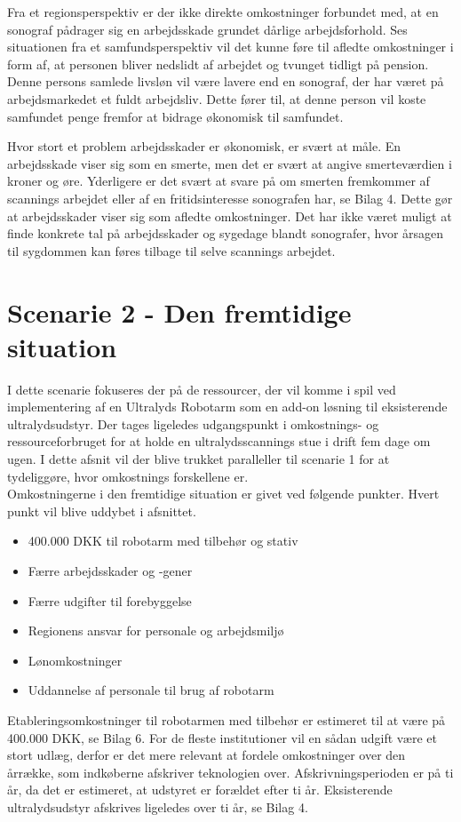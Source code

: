 Fra et regionsperspektiv er der ikke direkte omkostninger forbundet med, at en sonograf pådrager sig en arbejdsskade grundet dårlige arbejdsforhold. Ses situationen fra et samfundsperspektiv vil det kunne føre til afledte omkostninger i form af, at personen bliver nedslidt af arbejdet og tvunget tidligt på pension. Denne persons samlede livsløn vil være lavere end en sonograf, der har været på arbejdsmarkedet et fuldt arbejdsliv. Dette fører til, at denne person vil koste samfundet penge fremfor at bidrage økonomisk til samfundet. 

Hvor stort et problem arbejdsskader er økonomisk, er svært at måle. En arbejdsskade viser sig som en smerte, men det er svært at angive smerteværdien i kroner og øre. Yderligere er det svært
at svare på om smerten fremkommer af scannings arbejdet eller af en fritidsinteresse sonografen har, se Bilag 4. Dette gør at arbejdsskader viser sig som afledte omkostninger. Det har ikke været muligt at finde konkrete tal på arbejdsskader og sygedage blandt sonografer, hvor årsagen til sygdommen kan føres tilbage til selve scannings arbejdet.  


\section{Scenarie 2 - Den fremtidige situation} \label{fremtidige}
I dette scenarie fokuseres der på de ressourcer, der vil komme i spil ved implementering af en Ultralyds Robotarm som en add-on løsning til eksisterende ultralydsudstyr. Der tages ligeledes udgangspunkt i omkostnings- og ressourceforbruget for at holde en ultralydsscannings stue i drift fem dage om ugen. I dette afsnit vil der blive trukket paralleller til scenarie 1 for at tydeliggøre, hvor omkostnings forskellene er. \\
Omkostningerne i den fremtidige situation er givet ved følgende punkter. Hvert punkt vil blive uddybet i afsnittet.
\begin{itemize}
\item 400.000 DKK til robotarm med tilbehør og stativ
\item Færre arbejdsskader og -gener
\item Færre udgifter til forebyggelse
\item Regionens ansvar for personale og arbejdsmiljø
\item Lønomkostninger
\item Uddannelse af personale til brug af robotarm
\end{itemize}
Etableringsomkostninger til robotarmen med tilbehør er estimeret til at være på 400.000 DKK, se Bilag 6.
For de fleste institutioner vil en sådan udgift være et stort udlæg, derfor er det mere relevant at fordele omkostninger over den årrække, som indkøberne afskriver teknologien over. Afskrivningsperioden er på ti år, da det er estimeret, at udstyret er forældet efter ti år. Eksisterende ultralydsudstyr afskrives ligeledes over ti år, se Bilag 4.

